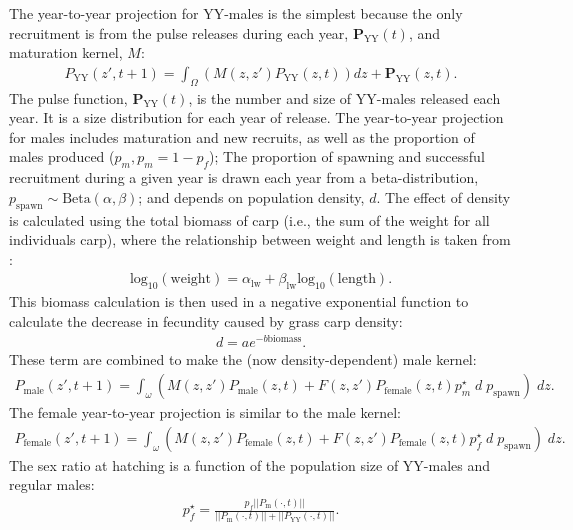 \documentclass{article}[12pt]
\begin{document}
The year-to-year projection for YY-males is the simplest because the only recruitment is from the pulse releases during each year, \(\textbf{P}_\text{YY}(t)\), and maturation kernel, \(M\):
\begin{eqnarray}
P_\text{YY}(z', t + 1) = \int_\Omega (M (z, z')P_\text{YY}(z, t)) dz + \textbf{P}_\text{YY}(z, t).
\end{eqnarray}
The pulse function, \(\textbf{P}_\text{YY}(t)\), is the number and size of YY-males released each year.
It is a size distribution for each year of release. 
The year-to-year projection for males includes maturation and new recruits, as well as the proportion of males produced (\(p_m, p_m = 1- p_f\)); 
The proportion of spawning and successful recruitment during a given year is drawn each year from a beta-distribution, \(p_\text{spawn} \sim \text{Beta}(\alpha, \beta)\); and 
depends on population density, \(d\).  
The effect of density is calculated using the total biomass of carp (i.e., the sum of the weight for all individuals carp), where
the relationship between weight and length is taken from \cite{wanner2009length}:
\begin{eqnarray}
\text{log}_{10} (\text{weight}) = \alpha_{\text{lw}} + \beta_\text{lw}\text{log}_{10} (\text{length}).
\end{eqnarray}
This biomass calculation is then used in a negative exponential function to calculate the decrease in fecundity caused by grass carp density:
\begin{eqnarray}
d  = a e^{-b \text{biomass}}.
\end{eqnarray}
These term are combined to make the (now density-dependent) male kernel:
\begin{eqnarray}
P_\text{male}(z', t + 1) = \int_\omega (M(z,z') P_\text{male}(z, t) + F(z,z') P_\text{female}(z, t) p_{m}^\star\; d \; p_\text{spawn}) \; dz.
\end{eqnarray}
The female year-to-year projection is similar to the male kernel:
\begin{eqnarray}
P_\text{female}(z', t + 1) = \int_\omega (M(z,z') P_\text{female}(z, t) + F(z,z') P_\text{female}(z, t) p_{f}^\star \; d \; p_\text{spawn}) \; dz.\label{eqn:femaleEQN}
\end{eqnarray}
The sex ratio at hatching is a function of the population size of YY-males and regular males:
\begin{eqnarray}
p_f^\star = \frac{p_f  ||P_\text{m}(\cdot, t)||}{||P_\text{m}(\cdot, t)|| + ||P_\text{YY}(\cdot, t)||}.
\end{eqnarray}
\end{document}
